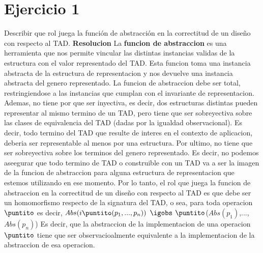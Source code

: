 \documentclass[10pt,a4paper]{article}
\begin{document}
\maketitle

\section{Ejercicio 1}

Describir que rol juega la función de abstracción en la correctitud de un diseño con respecto al TAD.
\newline
\newline
\textbf{Resolucion}
\newline
\newline
La \textbf{funcion de abstraccion} es una herramienta que nos permite vincular las distintas instancias validas de la estructura con el valor representado del TAD. Esta funcion toma una instancia abstracta de la estructura de representacion y nos devuelve una instancia abstracta del genero representado.
\newline
\newline
La funcion de abstraccion debe ser total, restringiendose a las instancias que cumplan con el invariante de representacion. 
\newline
\newline
Ademas, no tiene por que ser inyectiva, es decir, dos estructuras distintas pueden representar al mismo termino de un TAD, pero tiene que ser sobreyectiva sobre las clases de equivalencia del TAD (dadas por la igualdad observacional). Es decir, todo termino del TAD que resulte de interes en el contexto de aplicacion, deberia ser representable al menos por una estructura.   
\newline
\newline
Por ultimo, no tiene que ser sobreyectiva sobre los terminos del genero representado. Es decir, no podemos aseegurar que todo termino de TAD o construible con un TAD va a ser la imagen de la funcion de abstraccion para alguna estructura de representacion que estemos utilizando en ese momento.
\newline
\newline
Por lo tanto, el rol que juega la funcion de abstraccion en la correctitud de un diseño con respecto al TAD es que debe ser un homomorfismo respecto de la signatura del TAD, o sea, para toda operacion $\puntito$ es decir,
\newline
\newline
$Abs(i \puntito (p_{1},...,p_{n}))$ $\igobs$ $\puntito$($Abs(p_{1})$,...,$Abs(p_{n})$)
\newline
\newline
Es decir, que la abstraccion de la implementacion de una operacion $\puntito$ tiene que ser observacioalmente equivalente a la implementacion de la abstraccion de esa operacion. 
  
\newpage
\end{document}

